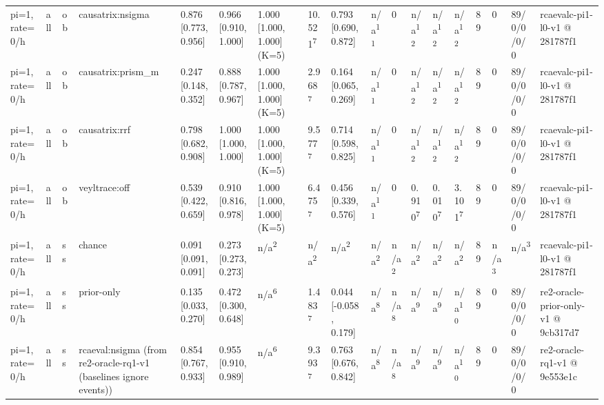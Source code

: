 \begin{table}[t]
\begin{tabular}{llllllllllllllllll}
pi=1, rate=0/h & all & ob & causatrix:nsigma & 0.876 [0.773, 0.956] & 0.966 [0.910, 1.000] & 1.000 [1.000, 1.000] (K=5) & 10.521\textsuperscript{7} & 0.793 [0.690, 0.872] & n/a\textsuperscript{11} & 0 & n/a\textsuperscript{12} & n/a\textsuperscript{12} & n/a\textsuperscript{12} & 89 & 0 & 89/0/0/0/0 & rcaevalc-pi1-l0-v1 @ 281787f1 \\
pi=1, rate=0/h & all & ob & causatrix:prism\_m & 0.247 [0.148, 0.352] & 0.888 [0.787, 0.967] & 1.000 [1.000, 1.000] (K=5) & 2.968\textsuperscript{7} & 0.164 [0.065, 0.269] & n/a\textsuperscript{11} & 0 & n/a\textsuperscript{12} & n/a\textsuperscript{12} & n/a\textsuperscript{12} & 89 & 0 & 89/0/0/0/0 & rcaevalc-pi1-l0-v1 @ 281787f1 \\
pi=1, rate=0/h & all & ob & causatrix:rrf & 0.798 [0.682, 0.908] & 1.000 [1.000, 1.000] & 1.000 [1.000, 1.000] (K=5) & 9.577\textsuperscript{7} & 0.714 [0.598, 0.825] & n/a\textsuperscript{11} & 0 & n/a\textsuperscript{12} & n/a\textsuperscript{12} & n/a\textsuperscript{12} & 89 & 0 & 89/0/0/0/0 & rcaevalc-pi1-l0-v1 @ 281787f1 \\
pi=1, rate=0/h & all & ob & veyltrace:off & 0.539 [0.422, 0.659] & 0.910 [0.816, 0.978] & 1.000 [1.000, 1.000] (K=5) & 6.475\textsuperscript{7} & 0.456 [0.339, 0.576] & n/a\textsuperscript{11} & 0 & 0.910\textsuperscript{7} & 0.010\textsuperscript{7} & 3.101\textsuperscript{7} & 89 & 0 & 89/0/0/0/0 & rcaevalc-pi1-l0-v1 @ 281787f1 \\
pi=1, rate=0/h & all & ss & chance & 0.091 [0.091, 0.091] & 0.273 [0.273, 0.273] & n/a\textsuperscript{2} & n/a\textsuperscript{2} & n/a\textsuperscript{2} & n/a\textsuperscript{2} & n/a\textsuperscript{2} & n/a\textsuperscript{2} & n/a\textsuperscript{2} & n/a\textsuperscript{2} & 89 & n/a\textsuperscript{3} & n/a\textsuperscript{3} & rcaevalc-pi1-l0-v1 @ 281787f1 \\
pi=1, rate=0/h & all & ss & prior-only & 0.135 [0.033, 0.270] & 0.472 [0.300, 0.648] & n/a\textsuperscript{6} & 1.483\textsuperscript{7} & 0.044 [-0.058, 0.179] & n/a\textsuperscript{8} & n/a\textsuperscript{8} & n/a\textsuperscript{9} & n/a\textsuperscript{9} & n/a\textsuperscript{10} & 89 & 0 & 89/0/0/0/0 & re2-oracle-prior-only-v1 @ 9cb317d7 \\
pi=1, rate=0/h & all & ss & rcaeval:nsigma (from re2-oracle-rq1-v1 (baselines ignore events)) & 0.854 [0.767, 0.933] & 0.955 [0.910, 0.989] & n/a\textsuperscript{6} & 9.393\textsuperscript{7} & 0.763 [0.676, 0.842] & n/a\textsuperscript{8} & n/a\textsuperscript{8} & n/a\textsuperscript{9} & n/a\textsuperscript{9} & n/a\textsuperscript{10} & 89 & 0 & 89/0/0/0/0 & re2-oracle-rq1-v1 @ 9e553e1c \\

\end{tabular}
\end{table}
